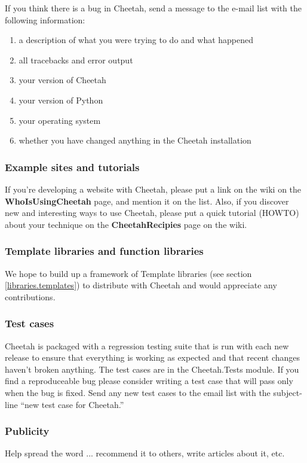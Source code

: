 If you think there is a bug in Cheetah, send a message to the e-mail list
with the following information:

\begin{enumerate}
\item a description of what you were trying to do and what happened
\item all tracebacks and error output
\item your version of Cheetah
\item your version of Python
\item your operating system
\item whether you have changed anything in the Cheetah installation
\end{enumerate}

\subsubsection{Example sites and tutorials}
If you're developing a website with Cheetah, please put a link on the wiki on
the {\bf WhoIsUsingCheetah} page, and mention it on the list.  Also, if you
discover new and interesting ways to use Cheetah, please put a quick tutorial
(HOWTO) about your technique on the {\bf CheetahRecipies} page on the wiki.

\subsubsection{Template libraries and function libraries}
We hope to build up a framework of Template libraries (see section
\ref{libraries.templates}) to distribute with Cheetah and would appreciate any
contributions.

\subsubsection{Test cases}
Cheetah is packaged with a regression testing suite that is run with each
new release to ensure that everything is working as expected and that recent
changes haven't broken anything.  The test cases are in the Cheetah.Tests
module.  If you find a reproduceable bug please consider writing a test case
that will pass only when the bug is fixed.  Send any new test cases to the email
list with the subject-line ``new test case for Cheetah.''

\subsubsection{Publicity}
Help spread the word ... recommend it to others, write articles about it, etc.

